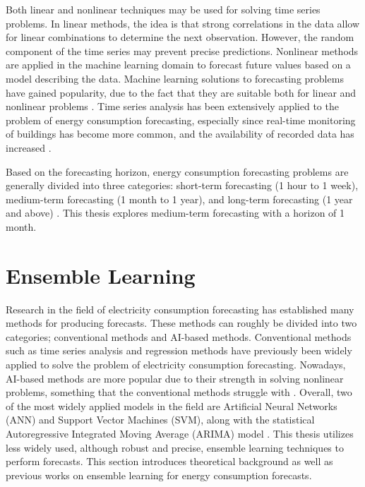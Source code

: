 Both linear and nonlinear techniques may be used for solving time series problems. In linear methods, the idea is that strong correlations in the data allow for linear combinations to determine the next observation. However, the random component of the time series may prevent precise predictions. Nonlinear methods are applied in the machine learning domain to forecast future values based on a model describing the data. Machine learning solutions to forecasting problems have gained popularity, due to the fact that they are suitable both for linear and nonlinear problems \cite{divina_stacking_2018}. Time series analysis has been extensively applied to the problem of energy consumption forecasting, especially since real-time monitoring of buildings has become more common, and the availability of recorded data has increased \cite{deb_review_2017}.

Based on the forecasting horizon, energy consumption forecasting problems are generally divided into three categories: short-term forecasting (1 hour to 1 week), medium-term forecasting (1 month to 1 year), and long-term forecasting (1 year and above) \cite{mat_daut_building_2017}. This thesis explores medium-term forecasting with a horizon of 1 month.

\section{Ensemble Learning}

Research in the field of electricity consumption forecasting has established many methods for producing forecasts. These methods can roughly be divided into two categories; conventional methods and AI-based methods. Conventional methods such as time series analysis and regression methods have previously been widely applied to solve the problem of electricity consumption forecasting. Nowadays, AI-based methods are more popular due to their strength in solving nonlinear problems, something that the conventional methods struggle with \cite{mat_daut_building_2017}. Overall, two of the most widely applied models in the field are Artificial Neural Networks (ANN) and Support Vector Machines (SVM), along with the statistical Autoregressive Integrated Moving Average (ARIMA) model \cite{nti_electricity_2020}. This thesis utilizes less widely used, although robust and precise, ensemble learning techniques to perform forecasts. This section introduces theoretical background as well as previous works on ensemble learning for energy consumption forecasts.


